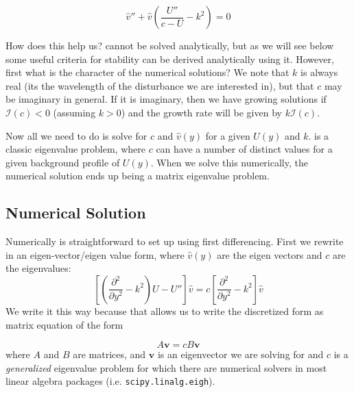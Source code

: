 \documentclass[11pt]{article}
\begin{document}
\begin{equation}
\label{eq:Rayleigh}
  \hat{v}'' + \hat{v}\left(\frac{U''}{c-U} - k^2\right) = 0
\end{equation}

How does this help us?   cannot be solved analytically, but
as we will see below some useful criteria for stability can be derived
analytically using it.  However, first what is the character of the numerical
solutions?  We note that $k$ is always real (its the wavelength of the
disturbance we are interested in), but that $c$ may be imaginary in general. 
If it is imaginary, then we have growing solutions if $\mathcal{I}(c) < 0$
(assuming $k>0$) and the growth rate will be given by $k\mathcal{I}(c)$.

Now all we need to do is solve for $c$ and $\hat{v}(y)$ for a given $U(y)$ and
$k$.  is a classic eigenvalue problem, where $c$ can have a
number of distinct values for a given background profile of $U(y)$.  When we
solve this numerically, the numerical solution ends up being a matrix
eigenvalue problem.  

\subsection{Numerical Solution}

Numerically  is straightforward to set up using first
differencing.  First we rewrite in an eigen-vector/eigen value form, where
$\hat{v}(y)$ are the eigen vectors and $c$ are the eigenvalues:
\begin{equation}
  \left[ \left(\frac{\partial^2}{\partial y^2} - k^2\right) U -
U''\right]\hat{v} = c \left[ \frac{\partial^2}{\partial y^2} - k^2\right]
\hat{v} 
\end{equation}
We write it this way because that allows us to write the discretized form as
matrix equation of the form 

\begin{equation}
 A \mathbf{v} = c B \mathbf{v}
\end{equation}
where $A$ and $B$ are matrices, and $\mathbf{v}$ is an eigenvector we are
solving for and $c$ is a \emph{generalized} eigenvalue problem for which there
are numerical solvers in most linear algebra packages (i.e.
\texttt{scipy.linalg.eigh}).  
\end{document}
